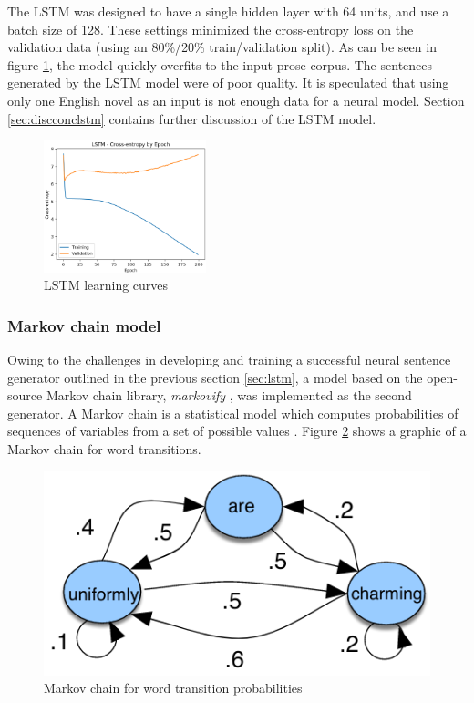 \documentclass[11pt,a4paper]{article}
\begin{document}
The LSTM was designed to have a single hidden layer with 64 units, and use a batch size of 128. These settings minimized the cross-entropy loss on the validation data (using an 80\%/20\% train/validation split). As can be seen in figure \ref{fig:LearningCurves}, the model quickly overfits to the input prose corpus. The sentences generated by the LSTM model were of poor quality. It is speculated that using only one English novel as an input is not enough data for a neural model. Section \ref{sec:discconclstm} contains further discussion of the LSTM model.

\begin{figure}[h]
    \centering
    \includegraphics[width=0.42\textwidth]{LSTM_Loss.png}
    \caption{LSTM learning curves}
    \label{fig:LearningCurves}
\end{figure}

\subsubsection{Markov chain model}
\label{sec:markov}
Owing to the challenges in developing and training a successful neural sentence generator outlined in the previous section \ref{sec:lstm}, a model based on the open-source Markov chain library, \textit{markovify} \cite{markovify}, was implemented as the second generator. A Markov chain is a statistical model which computes probabilities of sequences of variables from a set of possible values \cite[Chapter~8]{jurafskymarkov}. Figure \ref{fig:markov} shows a graphic of a Markov chain for word transitions.

\begin{figure}
	\centering
	\includegraphics[scale=0.35]{./markov_chain.png}
	\caption{Markov chain for word transition probabilities \cite{jurafskymarkov}}
\label{fig:markov}
\end{figure}
\end{document}
